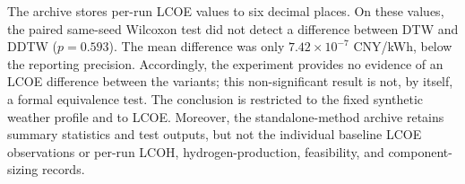\documentclass[review]{elsarticle}
\begin{document}
\begin{table}[htbp]
\centering
\caption{HRES2--H2 comparison against standalone metaheuristics. The reported
$p$-values are two-sided Mann--Whitney values adjusted by Holm over the nine
independent-sample comparisons of each framework variant.}
\label{tab:final-hres-tests}
\scriptsize
{}
\end{table}

The archive stores per-run LCOE values to six decimal places. On these values,
the paired same-seed Wilcoxon test did not detect a difference between DTW and
DDTW ($p=0.593$). The mean difference was only $7.42\times10^{-7}$ CNY/kWh,
below the reporting precision.
Accordingly, the experiment provides no evidence of an LCOE difference between
the variants; this non-significant result is not, by itself, a formal
equivalence test. The conclusion is restricted to the fixed synthetic weather
profile and to LCOE. Moreover, the standalone-method archive retains summary
statistics and test outputs, but not the individual baseline LCOE observations
or per-run LCOH, hydrogen-production, feasibility, and component-sizing
records.
\end{document}
